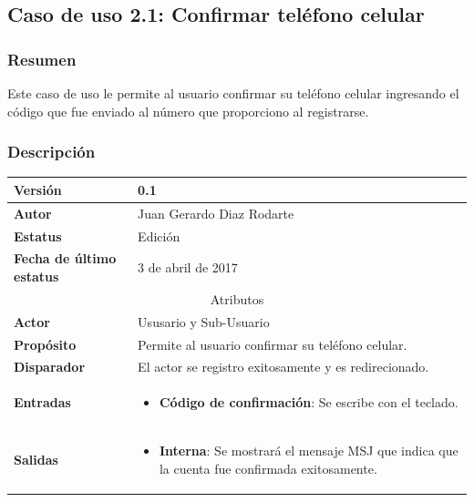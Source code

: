 \subsection{Caso de uso 2.1: Confirmar teléfono celular} \label{cu2_1}
\subsubsection{Resumen}
Este caso de uso le permite al usuario confirmar su teléfono celular ingresando el código que fue enviado al número que proporciono al registrarse.
\subsubsection{Descripción}
\begingroup
\setlength{\LTleft}{-10cm plus -1fill}
\setlength{\LTright}{\LTleft}
\begin{center}
  \addtocounter{table}{-1}
     \label{tab:cu2_1_tab}
  \begin{longtable}{| p{3.5cm} | p{11.5cm} |}
        \hline
      	\textbf{Versión} &  0.1 \\
        \hline 
       	\textbf{Autor} & Juan Gerardo Diaz Rodarte\\
        \hline
          \textbf{Estatus} & Edición \\
        \hline  
          \textbf{Fecha de último estatus} &  3 de abril de 2017 \\
        \hline
      \multicolumn{2}{|c|}{\large{Atributos}} \\
        \hline
          \textbf{Actor} & Ususario y Sub-Usuario \\
        \hline	
          \textbf{Propósito} &  Permite al usuario confirmar su teléfono celular. \\
        \hline
          \textbf{Disparador} & El actor se registro exitosamente y es redirecionado. \\
        \hline	
          \textbf{Entradas} &
	  \begin{itemize}
	    \item \textbf{Código de confirmación}: Se escribe con el teclado.
	  \end{itemize} \\
        \hline	
          \textbf{Salidas} & 
            \begin{itemize}
              \item \textbf{Interna}: Se mostrará el mensaje MSJ que indica que la cuenta fue confirmada exitosamente.
            \end{itemize} \\

\end{longtable}
\end{center}
